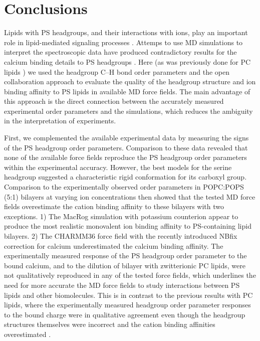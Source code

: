 \documentclass[aps,prl,superscriptaddress,twocolumn]{revtex4}
\begin{document}
\section{Conclusions}
Lipids with PS headgroups, and their interactions with ions,
play an important role in lipid-mediated signaling
processes \cite{leventis10,yeung08}. Attemps to use MD
simulations to interpret the spectroscopic data have produced contradictory results for the calcium binding details to PS
headgroups \cite{melcrova16,valentine18,hallock18}.  
Here (as was previously done for PC lipids \cite{botan15,catte16})
we used the headgroup C--H bond order parameters and the open collaboration approach to evaluate the quality
of the headgroup structure and ion binding affinity to PS lipids
in available MD force fields.
The main advantage of this approach is the direct connection
between the accurately measured experimental order parameters and the simulations,
which reduces the ambiguity in the interpretation of experiments.

First, we complemented the available experimental data \cite{browning80,roux90} by measuring the signs of the PS headgroup order parameters.
Comparison to these data revealed that none of the available force fields
reproduce the PS headgroup order parameters within the experimental accuracy. However,
the best models for the serine headgroup suggested a characteristic rigid conformation for its
carboxyl group. Comparison to the experimentally observed order parameters in POPC:POPS (5:1) bilayers  at varying ion
concentrations \cite{roux90} then showed that the tested MD force fields
overestimate the cation binding affinity to these bilayers with two exceptions. 1) The MacRog simulation with potassium counterion appear to produce the most realistic monovalent ion binding
affinity to PS-containing lipid bilayers. 2) The CHARMM36 force field with the recently introduced
NBfix correction for calcium \cite{kim16} underestimated the calcium binding affinity.
The experimentally measured response of the PS headgroup order parameter to the bound calcium, and to the dilution of bilayer with zwitterionic PC lipids, were not
qualitatively reproduced in any of the tested force fields, which underlines the need for more accurate
the MD force fields to study interactions between PS lipids and other biomolecules.
This is in contrast to the previous results with PC lipids,
where the experimentally measured headgroup order parameter responses to the bound charge
were in qualitative agreement even though the headgroup structures themselves were
incorrect and the cation binding affinities overestimated \cite{catte16}.
\end{document}
